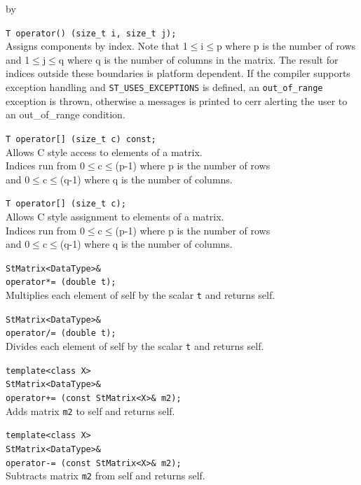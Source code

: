 \documentclass[twoside]{article}
\newcommand{\comp}[1]{\texttt{#1}}%
\newcommand{\entrylabel}[1]{\mbox{\textbf{{#1}}}\hfil}%
\newenvironment{entry}
{\begin{list}{}%
    {\renewcommand{\makelabel}{\entrylabel}%
     \setlength{\labelwidth}{90pt}%
     \setlength{\leftmargin}{\labelwidth}
     \advance\leftmargin by \labelsep%
      }%
    }%
  {\end{list}}
\newcommand{\Entrylabel}[1]%
{\raisebox{0pt}[1ex][0pt]{\makebox[\labelwidth][l]%
    {\parbox[t]{\labelwidth}{\hspace{0pt}\textbf{{#1}}}}}}
\newenvironment{Entry}%
{\renewcommand{\entrylabel}{\Entrylabel}\begin{entry}}%
  {\end{entry}}
\begin{document}
\begin{description}
\begin{Entry}
    \verb+T operator() (size_t i, size_t j);+\\
    Assigns components by index. Note that 1$\leq$i$\leq$p where p
    is the number of rows and 1$\leq$j$\leq$q where q is
    the number of columns in the matrix.  The result for
    indices outside these boundaries is platform
    dependent. If the compiler supports exception handling and
    \comp{ST\_USES\_EXCEPTIONS} is defined, an
    \comp{out\_of\_range} exception is thrown, otherwise a
    messages is printed to cerr alerting the user to an out\_of\_range
    condition.
    
    \verb+T operator[] (size_t c) const;+\\
    Allows C style access to elements of a matrix. \\
    Indices run from  0$\leq$c$\leq$(p-1) where p is the
    number of rows \\
    and 0$\leq$c$\leq$(q-1) where q is the number of columns.

    \verb+T operator[] (size_t c);+\\
    Allows C style assignment to elements of a matrix. \\
    Indices run from  0$\leq$c$\leq$(p-1) where p is the
    number of rows \\
    and 0$\leq$c$\leq$(q-1) where q is the number of columns.
    
    \verb+StMatrix<DataType>&+\\
    \verb+operator*= (double t);+\\
    Multiplies each element of self by the scalar \comp{t}
    and returns self.
    
    \verb+StMatrix<DataType>&+\\
    \verb+operator/= (double t);+\\
    Divides each element of self by the scalar \comp{t}
    and returns self.
    
    \verb+template<class X>+\\
    \verb+StMatrix<DataType>&+\\
    \verb#operator+= (const StMatrix<X>& m2);#\\
    Adds matrix \comp{m2} to self and returns self.
    
    \verb+template<class X>+\\
    \verb+StMatrix<DataType>&+\\
    \verb+operator-= (const StMatrix<X>& m2);+\\
    Subtracts matrix \comp{m2} from self and returns self.


\end{Entry}
\end{description}
\end{document}
